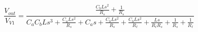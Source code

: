 \begin{equation}
\frac{V_{out}}{V_{V1}} = \frac{\frac{C_{b} L s^{2}}{R_{s}} + \frac{1}{R_{s}}}{C_{a} C_{b} L s^{3} + \frac{C_{a} L s^{2}}{R_{s}} + C_{a} s + \frac{C_{b} L s^{2}}{R_{s}} + \frac{C_{b} L s^{2}}{R_{\ell}} + \frac{L s}{R_{\ell} R_{s}} + \frac{1}{R_{s}} + \frac{1}{R_{\ell}}}
\end{equation}

